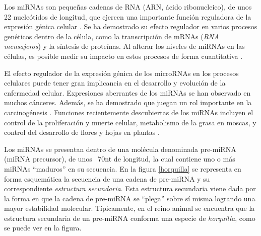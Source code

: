 \documentclass[12pt,bibliography=oldstyle,DIV=12,parskip=full-]{scrartcl}
\begin{document}
Los miRNAs son pequeñas cadenas de RNA (ARN, ácido ribonucleico), de
unos 22 nucleótidos de longitud, que ejercen una importante función
reguladora de la expresión génica celular \cite{bartel116}.  Se ha
demostrado su efecto regulador en varios procesos genéticos dentro de
la célula, como la transcripción de mRNAs (\emph{RNA mensajeros}) y la
síntesis de proteínas. Al alterar los niveles de miRNAs en las
células, es posible medir su impacto en estos procesos de forma
cuantitativa \cite{lili}.

El efecto regulador de la expresión génica de los microRNAs en los
procesos celulares puede tener gran implicancia en el desarrollo y
evolución de la enfermedad celular. Expresiones aberrantes de los
miRNAs se han observado en muchos cánceres. Además, se ha demostrado
que juegan un rol importante en la carcinogénesis \cite{lili}. 
Funciones recientemente descubiertas de los miRNAs incluyen el control
de la proliferación y muerte celular, metabolismo de la grasa en
moscas, y control del desarrollo de flores y hojas en
plantas \cite{bartel116}. 

\newpage
Los miRNAs se presentan dentro de una molécula denominada pre-miRNA
(miRNA precursor), de unos ~70nt de longitud, la cual contiene uno o
más miRNAs ``maduros'' en su secuencia.  En la figura \ref{horquilla}
se representa en forma esquemática la secuencia de una cadena de
pre-miRNA y su correspondiente \emph{estructura secundaria}. Esta
estructura secundaria viene dada por la forma en que la cadena de
pre-miRNA se ``plega'' sobre sí misma logrando una mayor estabilidad
molecular. Típicamente, en el reino animal se encuentra que la
estructura secundaria de un pre-miRNA conforma una especie de
\emph{horquilla}, como se puede ver en la figura.
\cite{bartel116}\cite{sewer}
\end{document}
